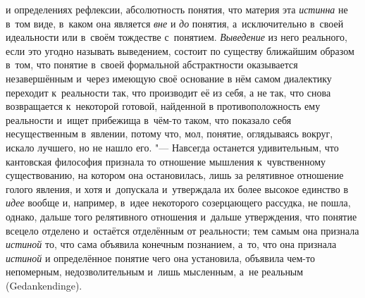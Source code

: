 и определениях рефлексии, абсолютность понятия, что материя эта
{\em истинна} не в~том
виде, в~каком она является {\em вне}
и {\em до}
понятия, а~исключительно в~своей идеальности или в~своём
тождестве с~понятием. {\em Выведение}
из него реального, если это угодно называть выведением,
состоит по существу ближайшим образом в~том, что понятие в~своей формальной
абстрактности оказывается незавершённым и~через имеющую своё основание в
нём самом диалектику переходит к~реальности так, что производит её из себя,
а не так, что снова возвращается к~некоторой готовой, найденной в
противоположность ему реальности и~ищет прибежища в~чём-то таком, что
показало себя несущественным в~явлении, потому что, мол,
понятие, оглядываясь вокруг, искало лучшего, но не нашло
его. "--- Навсегда останется удивительным, что кантовская
философия признала то отношение мышления к~чувственному существованию, на
котором она остановилась, лишь за релятивное отношение голого явления, и
хотя и~допускала и~утверждала их более высокое единство в
{\em идее} вообще и,
например, в~идее некоторого созерцающего рассудка, не пошла, однако, дальше
того релятивного отношения и~дальше утверждения, что понятие всецело
отделено и~остаётся отделённым от реальности; тем самым она признала
{\em истиной} то, что
сама объявила конечным познанием, а~то, что она признала
{\em истиной} и
определённое понятие чего она установила, объявила чем-то непомерным,
недозволительным и~лишь мысленным, а~не реальным (Gedan\-kendin\-ge).

